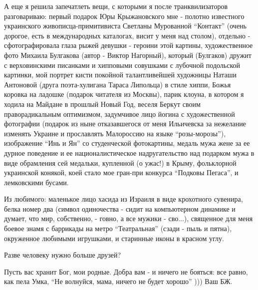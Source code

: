 А еще я решила запечатлеть вещи, с которыми я после транквилизаторов
разговариваю: первый подарок Юры Крыжановского мне - полотно известного
украинского живописца-примитивиста Светланы Мурованной \enquote{Контакт} (очень
дорогое, есть в международных каталогах, висит у меня над столом), отдельно -
сфотографировала глаза рыжей девушки - героини этой картины, художественное
фото Михаила Булгакова (автор - Виктор Нагорный), который (Булгаков) дружит с
верховинскими писанками и хипповыми совушками с лубочной подольской картинки,
мой портрет кисти покойной талантливейшей художницы Наташи Антоновой (друга
поэта-хулигана Тараса Липольца) в стиле хиппи, Божья коровка на ладошке
(подарок читателя из Москвы), парик клоуна, в котором я ходила на Майдане в
прошлый Новый Год, веселя Беркут своим праворадикальным оптимизмом, задумчивое
лицо йогина с художественной фотографии (подарок из ныне отказавшегося от меня
Ильичевска за нежелание изменять Украине и прославлять Малороссию на языке
\enquote{розы-морозы}), изображение \enquote{Инь и Ян} со студенческой фотокартины, медаль мужа
жене за ее дурное поведение и ее националистическое надругательство над
подарком мужа в виде обрамления сей медальки, купленной (о ужас!) в Крыму,
фольклорной украинской конякой, коей стало мое гран-при конкурса \enquote{Подковы
Пегаса}, и лемковскими бусами. 

Из любимого: маленькое лицо хасида из Израиля в виде крохотного сувенира, белка
номер два (символ одиночества - сидит на компьютерном динамике и думает, что
мир, собственно, - говно, а все мужики - сво...), священное для меня боевое
знамя с баррикады на метро \enquote{Театральная} (сзади - пыль и пятна), окруженное
любимыми игрушками, и старинные иконы в красном углу. 

Разве человеку нужно больше друзей? 

Пусть вас хранит Бог, мои родные. Добра вам - и ничего не бояться: все равно,
как пела Умка, \enquote{Не волнуйся, мама, ничего не будет хорошо} ))) Ваш БЖ. 

